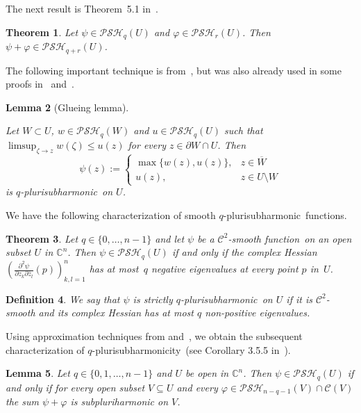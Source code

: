 \documentclass[10pt,a4paper]{amsart}
\newtheorem{thm}{Theorem}[section]
\newtheorem{lem}[thm]{Lemma}
\newtheorem{defn}[thm]{Definition}
\numberwithin{equation}{section}
\newcommand{\cbb}{\mathbb{C}}
\newcommand{\ccal}{\mathcal{C}}
\newcommand{\qpsh}{$q$-pluri\-sub\-harmonic}
\newcommand{\qpshy}{$q$-pluri\-sub\-harmonicity}
\newcommand{\PSH}{\mathcal{PSH}}
\newcommand{\cl}[1]{\overline{#1}}
\newcommand{\fct}{function}
\newcommand{\fcts}{functions}
\begin{document}
The next result is Theorem~5.1 in~\cite{Sl84}.

\begin{thm}\label{thm-add-qpsh} Let $\psi \in \PSH_q(U)$ and $\varphi \in \PSH_r(U)$. Then $\psi+\varphi \in \PSH_{q+r}(U)$.
\end{thm}

The following important technique is from~\cite{Dieu}, but was also already used in some proofs in~\cite{HM} and~\cite{Sl84}.

\begin{lem}[Glueing lemma]\label{lem-glueing}

Let $W \subset U$, $w \in \PSH_q(W)$ and $u \in \PSH_q(U)$ such that $\limsup_{\zeta \to z} w(\zeta) \leq u(z)$ for every $z \in \partial W \cap U$. Then
\[
\psi(z):=\begin{cases} \max\{w(z),u(z)\}, & z \in \cl{W} \\ u(z), & z \in U\setminus W \end{cases}
\]
is \qpsh\ on $U$.
\end{lem}

We have the following characterization of smooth \qpsh\ \fcts.

\begin{thm}\label{smooth-qpsh} Let $q \in \{0,\ldots,n-1\}$ and let $\psi$ be a $\ccal^2$-smooth \fct\ on an open subset $U$ in $\cbb^n$. Then $\psi \in \PSH_q(U)$ if and only if the complex Hessian $\left( \frac{\partial^2 \psi}{\partial z_k \partial \overline{z}_l}(p)\right)_{k,l=1}^n$ has at most~$q$ negative eigenvalues at every point $p$ in~$U$.
\end{thm}

\begin{defn}\label{defn-sqpsh} We say that $\psi$ is \textit{strictly \qpsh}\ on $U$ if it is $\ccal^2$-smooth and its complex Hessian has at most $q$ non-positive eigenvalues.
\end{defn}

Using approximation techniques from \cite{Sl84} and~\cite{Bu}, we obtain the subsequent characterization of \qpshy\ (see Corollary 3.5.5 in~\cite{TPTHESIS}).

\begin{lem}\label{lem-char-qpsh} Let $q \in \{0,1,\ldots,n-1\}$ and $U$ be open in $\cbb^n$. Then $\psi \in \PSH_q(U)$ if and only if for every open subset $V \subseteq U$ and every $\varphi \in \PSH_{n-q-1}(V) \cap \ccal(V)$ the sum $\psi+\varphi$ is subpluriharmonic on $V$.
\end{lem}
\end{document}
